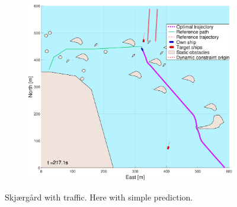 \begin{figure}[ht]
\begin{subfigure}[b]{0.494\textwidth}
        \subcaption{}
    \end{subfigure}
    \hfill
    \begin{subfigure}[b]{0.494\textwidth}
        \centering
        \includegraphics[width=\textwidth]{Images/NewFigures/skjergard_m_trafikk_NEW/_Simple_1fig999_time=218}
        \subcaption{}
    \end{subfigure}
    \hfill
    \caption{Skjærgård with traffic. Here with simple prediction.}
\end{figure}
